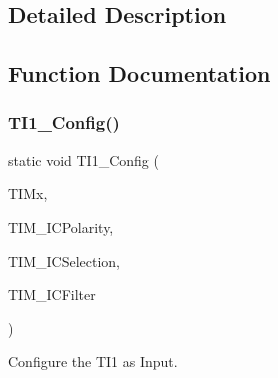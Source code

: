 \subsection{Detailed Description}


\subsection{Function Documentation}
\mbox{\label{group__TIM__Private__Functions_gac8dbcb0d903cc0a3491155b5b4fbee65}} 
\subsubsection{T\+I1\+\_\+\+Config()}
{\footnotesize\ttfamily static void T\+I1\+\_\+\+Config (\begin{DoxyParamCaption}\item[{\textbf{ T\+I\+M\+\_\+\+Type\+Def} $\ast$}]{T\+I\+Mx,  }\item[{uint16\+\_\+t}]{T\+I\+M\+\_\+\+I\+C\+Polarity,  }\item[{uint16\+\_\+t}]{T\+I\+M\+\_\+\+I\+C\+Selection,  }\item[{uint16\+\_\+t}]{T\+I\+M\+\_\+\+I\+C\+Filter }\end{DoxyParamCaption})\hspace{0.3cm}{\ttfamily [static]}}



Configure the T\+I1 as Input. 


